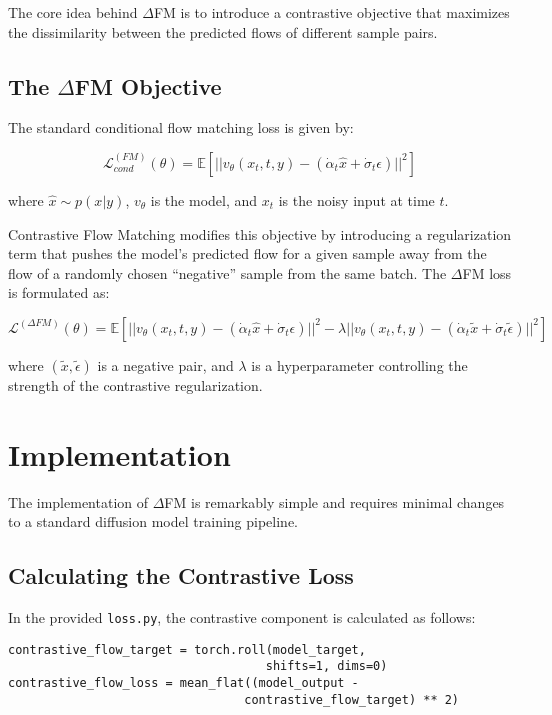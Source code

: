 \documentclass{article}
\begin{document}
The core idea behind $\Delta$FM is to introduce a contrastive objective that maximizes the dissimilarity between the predicted flows of different sample pairs.

\subsection{The $\Delta$FM Objective}

The standard conditional flow matching loss is given by:

$$ \mathcal{L}_{cond}^{(FM)}(\theta) = \mathbb{E}[||v_{\theta}(x_{t}, t, y) - (\dot{\alpha}_{t}\hat{x} + \dot{\sigma}_{t}\epsilon)||^{2}] $$

where $\hat{x} \sim p(x|y)$, $v_{\theta}$ is the model, and $x_t$ is the noisy input at time $t$.

Contrastive Flow Matching modifies this objective by introducing a regularization term that pushes the model's predicted flow for a given sample away from the flow of a randomly chosen ``negative'' sample from the same batch. The $\Delta$FM loss is formulated as:

$$ \mathcal{L}^{(\Delta FM)}(\theta) = \mathbb{E}[||v_{\theta}(x_{t}, t, y) - (\dot{\alpha}_{t}\hat{x} + \dot{\sigma}_{t}\epsilon)||^{2} - \lambda||v_{\theta}(x_{t}, t, y) - (\dot{\alpha}_{t}\tilde{x} + \dot{\sigma}_{t}\tilde{\epsilon})||^{2}] $$

where $(\tilde{x}, \tilde{\epsilon})$ is a negative pair, and $\lambda$ is a hyperparameter controlling the strength of the contrastive regularization.

\section{Implementation}

The implementation of $\Delta$FM is remarkably simple and requires minimal changes to a standard diffusion model training pipeline.

\subsection{Calculating the Contrastive Loss}

In the provided \texttt{loss.py}, the contrastive component is calculated as follows:

\begin{verbatim}
contrastive_flow_target = torch.roll(model_target, 
                                    shifts=1, dims=0)
contrastive_flow_loss = mean_flat((model_output - 
                                 contrastive_flow_target) ** 2)
\end{verbatim}
\end{document}
